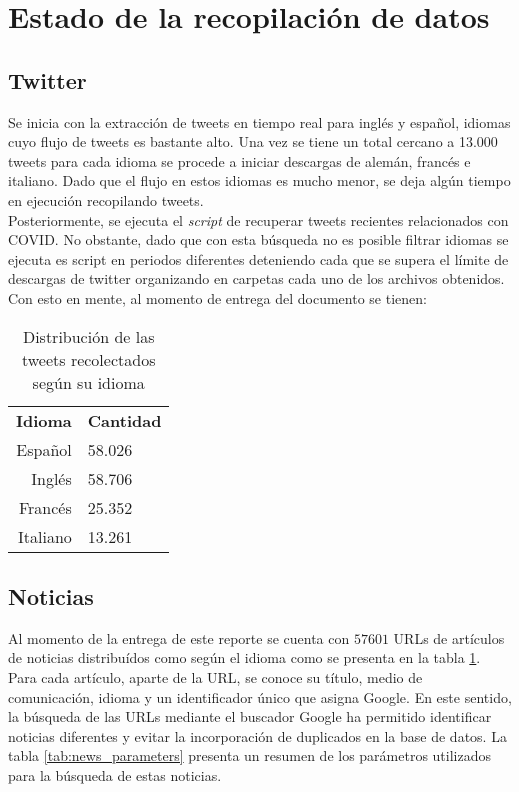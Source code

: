 \section{Estado de la recopilación de datos}

\subsection{Twitter}
Se inicia con la extracción de tweets en tiempo real para inglés y español, idiomas cuyo flujo de tweets es bastante alto. Una vez se tiene un total cercano a 13.000 tweets para cada idioma se procede a iniciar descargas de alemán, francés e italiano. Dado que el flujo en estos idiomas es mucho menor, se deja algún tiempo en ejecución recopilando tweets.\\

Posteriormente, se ejecuta el \textit{script} de recuperar tweets recientes relacionados con COVID. No obstante, dado que con esta búsqueda no es posible filtrar idiomas se ejecuta es script en periodos diferentes deteniendo cada que se supera el límite de descargas de twitter organizando en carpetas cada uno de los archivos obtenidos. Con esto en mente, al momento de entrega del documento se tienen:
\begin{table}[h]
    \centering
    \begin{tabular}{r|l}
        \textbf{Idioma} & \textbf{Cantidad} \\
        Español & 58.026 \\
        Inglés & 58.706 \\
        Francés & 25.352 \\
        Italiano & 13.261
    \end{tabular}
    \caption{Distribución de las tweets recolectados según su idioma}
    \label{tab:news_results}
\end{table}

\subsection{Noticias}
Al momento de la entrega de este reporte se cuenta con $57601$ URLs de artículos de noticias distribuídos como según el idioma como se presenta en la tabla \ref{tab:news_results}. Para cada artículo, aparte de la URL, se conoce su título, medio de comunicación, idioma y un identificador único que asigna Google. En este sentido, la búsqueda de las URLs mediante el buscador Google ha permitido identificar noticias diferentes y evitar la incorporación de duplicados en la base de datos. La tabla \ref{tab:news_parameters} presenta un resumen de los parámetros utilizados para la búsqueda de estas noticias.

